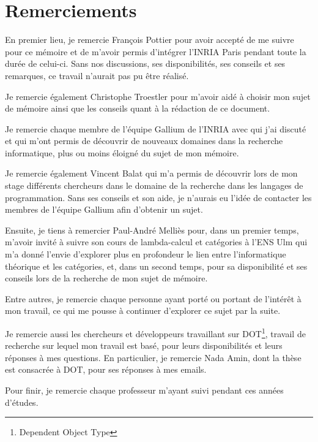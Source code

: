 \chapter*{Remerciements}

En premier lieu, je remercie François Pottier pour avoir accepté de me suivre
pour ce mémoire et de m'avoir permis d'intégrer l'INRIA Paris pendant toute la
durée de celui-ci. Sans nos discussions, ses disponibilités, ses conseils et ses
remarques, ce travail n'aurait pas pu être réalisé.

Je remercie également Christophe Troestler pour m'avoir aidé à choisir mon sujet
de mémoire ainsi que les conseils quant à la rédaction de ce document.

Je remercie chaque membre de l'équipe Gallium de
l'INRIA avec qui j'ai discuté et qui m'ont permis de découvrir de nouveaux
domaines dans la recherche informatique, plus ou moins éloigné du sujet de mon mémoire.

Je remercie également Vincent Balat qui m'a permis de découvrir lors de mon
stage différents chercheurs dans le domaine de la recherche dans les langages de
programmation. Sans ses conseils et son aide, je n'aurais eu l'idée de contacter
les membres de l'équipe Gallium afin d'obtenir un sujet.

Ensuite, je tiens à remercier Paul-André Melliès pour, dans un premier temps,
m'avoir invité à suivre son cours de lambda-calcul et catégories à l'ENS Ulm qui
m'a donné l'envie d'explorer plus en profondeur le lien entre l'informatique
théorique et les catégories, et,
dans un second temps, pour sa disponibilité et ses conseils lors de la recherche
de mon sujet de mémoire.

Entre autres, je remercie chaque personne ayant porté ou portant de l'intérêt à mon
travail, ce qui me pousse à continuer d'explorer ce sujet par la suite.

Je remercie aussi les chercheurs et développeurs travaillant sur
DOT\footnote{Dependent Object Type}, travail de recherche sur lequel mon travail
est basé, pour leurs disponibilités et leurs réponses à mes questions. En
particulier, je remercie Nada Amin, dont la thèse est consacrée à DOT, pour ses
réponses à mes emails.

Pour finir, je remercie chaque professeur m'ayant suivi pendant ces années
d'études.